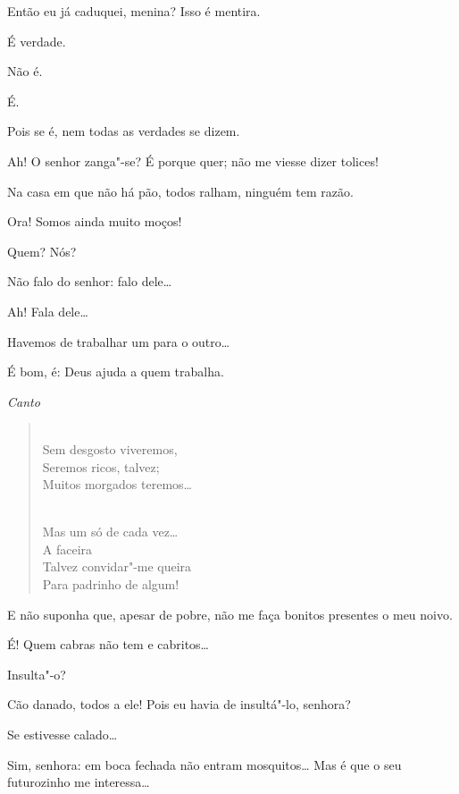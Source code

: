 \begin{linenumbers}
   Então eu já caduquei, menina?  Isso é
mentira.

  É verdade.

  Não é.

  É.

  Pois se é, nem todas as verdades se dizem.  

  Ah! O senhor zanga"-se? É porque quer; não me viesse dizer tolices!

  Na casa em
que não há pão, todos ralham, ninguém tem razão.

  Ora! Somos ainda muito moços!

  Quem? Nós?

   Não falo do senhor: falo dele\ldots{}

  Ah! Fala dele\ldots{}

  Havemos de trabalhar um para o outro\ldots{}

  É bom, é: Deus ajuda a quem trabalha.

{\smallskip\raggedleft\itshape Canto\par}
\begin{verse}
\\
Sem desgosto viveremos,\\
Seremos ricos, talvez;\\
Muitos morgados teremos\ldots{}

{}\\
Mas um só de cada vez\ldots{}\\
 A faceira\\
Talvez convidar"-me queira\\
Para padrinho de algum!
\end{verse}

  E não suponha que, apesar de pobre, não me faça bonitos presentes
o meu noivo.

  É! Quem cabras não tem e cabritos\ldots{}

  Insulta"-o?

  Cão danado, todos a ele! Pois eu havia de insultá"-lo, senhora?

  Se estivesse calado\ldots{}

  Sim, senhora: em boca fechada não entram mosquitos\ldots{} Mas é
que o seu futurozinho me interessa\ldots{}


\end{linenumbers}
